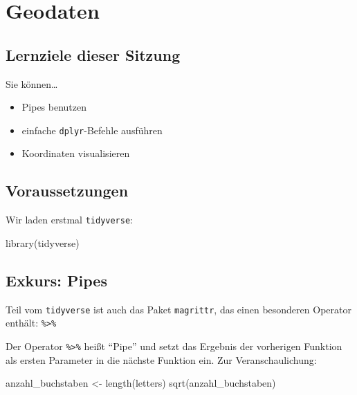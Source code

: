 \documentclass[
  ngerman,
]{article}
\newenvironment{Shaded}{\begin{snugshade}}{\end{snugshade}}
\newcommand{\FunctionTok}[1]{\textcolor[rgb]{0.00,0.00,0.00}{#1}}
\newcommand{\NormalTok}[1]{#1}
\newcommand{\OtherTok}[1]{\textcolor[rgb]{0.56,0.35,0.01}{#1}}
\providecommand{\tightlist}{%
  \setlength{\itemsep}{0pt}\setlength{\parskip}{0pt}}
\begin{document}
\hypertarget{geodaten}{%
\section{Geodaten}\label{geodaten}}

\hypertarget{lernziele-dieser-sitzung-2}{%
\subsection{Lernziele dieser Sitzung}\label{lernziele-dieser-sitzung-2}}

Sie können\ldots{}

\begin{itemize}
\tightlist
\item
  Pipes benutzen
\item
  einfache \texttt{dplyr}-Befehle ausführen
\item
  Koordinaten visualisieren
\end{itemize}

\hypertarget{voraussetzungen-1}{%
\subsection{Voraussetzungen}\label{voraussetzungen-1}}

Wir laden erstmal \texttt{tidyverse}:

\begin{Shaded}
\begin{Highlighting}[]
\FunctionTok{library}\NormalTok{(tidyverse)}
\end{Highlighting}
\end{Shaded}

\hypertarget{exkurs-pipes}{%
\subsection{Exkurs: Pipes}\label{exkurs-pipes}}

Teil vom \texttt{tidyverse} ist auch das Paket \texttt{magrittr}, das einen besonderen Operator enthält: \texttt{\%\textgreater{}\%}

Der Operator \texttt{\%\textgreater{}\%} heißt ``Pipe'' und setzt das Ergebnis der vorherigen Funktion als ersten Parameter in die nächste Funktion ein. Zur Veranschaulichung:

\begin{Shaded}
\begin{Highlighting}[]
\NormalTok{anzahl\_buchstaben }\OtherTok{\textless{}{-}} \FunctionTok{length}\NormalTok{(letters)}
\FunctionTok{sqrt}\NormalTok{(anzahl\_buchstaben)}
\end{Highlighting}
\end{Shaded}
\end{document}
